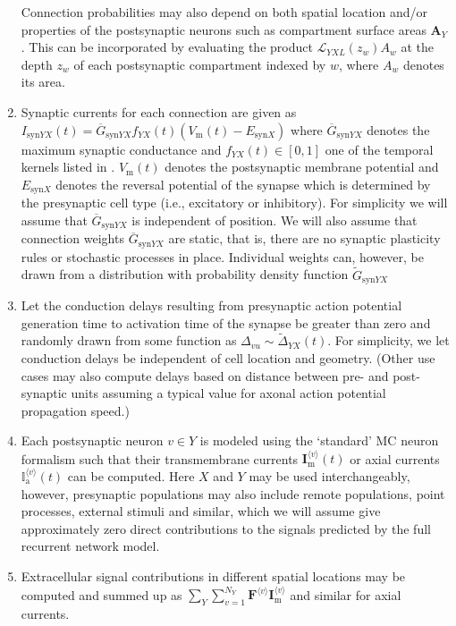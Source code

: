 \begin{enumerate}
Connection probabilities may also depend on both spatial location and/or properties of the postsynaptic neurons such as compartment surface areas $\mathbf{A}_Y$. 
This can be incorporated by evaluating the product $\mathcal{L}_{YXL}(z_w)A_w$  at the depth $z_w$ of each postsynaptic compartment indexed by $w$, where $A_w$ denotes its area. 
\item Synaptic currents for each connection are given as $I_{\text{syn}YX}(t)=\overline{G}_{\text{syn}YX} f_{YX}(t)(V_\text{m}(t)-E_{\text{syn}X})$
where $\overline{G}_{\text{syn}YX}$ denotes the maximum synaptic conductance and $f_{YX}(t) \in [0, 1]$ one of the temporal kernels listed in .
$V_\text{m}(t)$ denotes the postsynaptic membrane potential and 
$E_{\text{syn}X}$ denotes the reversal potential of the synapse which is determined by the presynaptic cell type (i.e., excitatory or inhibitory).
For simplicity we will assume that $\overline{G}_{\text{syn}YX}$ is independent of position.
We will also assume that connection weights $\overline{G}_{\text{syn}YX}$ are static, 
that is, there are no synaptic plasticity rules or stochastic processes in place. 
Individual weights can, however, be drawn from a distribution with probability density function $\widetilde{G}_{\text{syn}YX}$
\item Let the conduction delays resulting from presynaptic action potential generation time to activation time of the synapse be greater than zero and randomly drawn from some function as $\Delta_{vu} \sim \widetilde{\Delta}_{YX}(t)$.
For simplicity, we let conduction delays be independent of cell location and geometry.
(Other use cases may also compute delays based on distance between pre- and post-synaptic units assuming a typical value for axonal action potential propagation speed.)
\item Each postsynaptic neuron $v \in Y$ is modeled using the  `standard' MC neuron formalism such that their transmembrane currents $\mathbf{I}_\text{m}^{\langle v \rangle}(t)$ or axial currents $\mathbb{I}_\text{a}^{\langle v \rangle}(t)$ can be computed.
Here $X$ and $Y$ may be used interchangeably, however,
presynaptic populations may also include remote populations, point processes, external stimuli and similar,
which we will assume give approximately zero direct contributions to the signals predicted by the full recurrent network model.
\item Extracellular signal contributions in different spatial locations may be computed and summed up as
$\sum_Y \sum_{v=1}^{N_Y} \mathbf{F}^{\langle v \rangle} \mathbf{I}_\text{m}^{\langle v \rangle}$ and similar for axial currents.

\end{enumerate}

